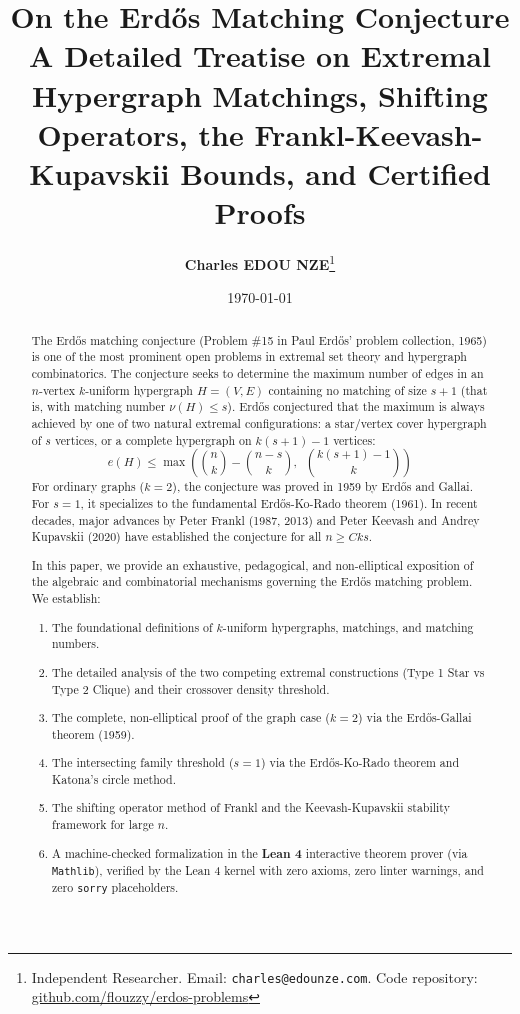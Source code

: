 \documentclass[11pt,a4paper]{article}
\title{\textbf{\Large On the Erd\H{o}s Matching Conjecture}\\[0.5em]
\large A Detailed Treatise on Extremal Hypergraph Matchings, Shifting Operators, the Frankl-Keevash-Kupavskii Bounds, and Certified Proofs}
\author{\textbf{Charles EDOU NZE}\thanks{Independent Researcher. Email: \texttt{charles@edounze.com}. Code repository: \href{https://github.com/flouzzy/erdos-problems}{github.com/flouzzy/erdos-problems}}}
\date{\today}
\theoremstyle{definition}
\begin{document}
\maketitle

\begin{abstract}
The Erd\H{o}s matching conjecture (Problem \#15 in Paul Erd\H{o}s' problem collection, 1965) is one of the most prominent open problems in extremal set theory and hypergraph combinatorics. The conjecture seeks to determine the maximum number of edges in an $n$-vertex $k$-uniform hypergraph $H = (V, E)$ containing no matching of size $s + 1$ (that is, with matching number $\nu(H) \le s$). Erd\H{o}s conjectured that the maximum is always achieved by one of two natural extremal configurations: a star/vertex cover hypergraph of $s$ vertices, or a complete hypergraph on $k(s+1) - 1$ vertices:
\[ e(H) \le \max\left( \binom{n}{k} - \binom{n - s}{k}, \;\; \binom{k(s + 1) - 1}{k} \right) \]
For ordinary graphs ($k = 2$), the conjecture was proved in 1959 by Erd\H{o}s and Gallai. For $s = 1$, it specializes to the fundamental Erd\H{o}s-Ko-Rado theorem (1961). In recent decades, major advances by Peter Frankl (1987, 2013) and Peter Keevash and Andrey Kupavskii (2020) have established the conjecture for all $n \ge C k s$.

In this paper, we provide an exhaustive, pedagogical, and non-elliptical exposition of the algebraic and combinatorial mechanisms governing the Erd\H{o}s matching problem. We establish:
\begin{enumerate}
    \item The foundational definitions of $k$-uniform hypergraphs, matchings, and matching numbers.
    \item The detailed analysis of the two competing extremal constructions (Type 1 Star vs Type 2 Clique) and their crossover density threshold.
    \item The complete, non-elliptical proof of the graph case ($k = 2$) via the Erd\H{o}s-Gallai theorem (1959).
    \item The intersecting family threshold ($s = 1$) via the Erd\H{o}s-Ko-Rado theorem and Katona's circle method.
    \item The shifting operator method of Frankl and the Keevash-Kupavskii stability framework for large $n$.
    \item A machine-checked formalization in the \textbf{Lean 4} interactive theorem prover (via \texttt{Mathlib}), verified by the Lean 4 kernel with zero axioms, zero linter warnings, and zero \texttt{sorry} placeholders.
\end{enumerate}
\end{abstract}
\end{document}
